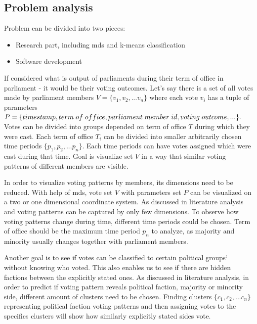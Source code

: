 \documentclass[a4paper,12pt]{article}
\begin{document}
	\clearpage
	 
 	 
 	\subsection{Problem analysis}
 	
 	Problem can be divided into two pieces:
 	\begin{itemize}
 		\item Research part, including \gls{mds} and \gls{k-means} classification
 		\item Software development
 	\end{itemize}
 	
 	If considered what is output of parliaments during their term of office in parliament - it would be their voting outcomes. Let's say there is a set of all votes made by parliament members $V = \{v_1, v_2, ... v_n\}$ where each vote $v_i$ has a tuple of parameters
	$	P = \{timestamp, term\; of\; office, \\ parliament\;member\;id, voting\;outcome,...\}.$	
 	 Votes can be divided into groups depended on term of office $T$ during which they were cast. Each term of office $T_i$ can be divided into smaller arbitrarily chosen time periods $\{p_1, p_2, ...p_n\}$. Each time periods can have votes assigned which were cast during that time. Goal is visualize set $V$ in a way that similar voting patterns of different members are visible. 
 	
 	In order to visualize voting patterns by members, its dimensions need to be reduced. With help of \acrfull{mds}, vote set $V$ with parameters set $P$ can be visualized on a two or one dimensional coordinate system. As discussed in literature analysis and \cite{poole_2005} voting patterns can be captured by only few dimensions. To observe how voting patterns change during time, different time periods could be chosen. Term of office should be the maximum time period $p_n$ to analyze, as majority and minority usually changes together with parliament members.
 	
 	Another goal is to see if votes can be classified to certain political groups` without knowing who voted. This also enables us to see if there are hidden factions between the explicitly stated ones. As discussed in literature analysis, in order to predict if voting pattern reveals political faction, majority or minority side, different amount of clusters need to be chosen. Finding clusters $\{c_1, c_2,...c_n\}$ representing political faction voting patterns and then assigning votes to the specifics clusters will show how similarly explicitly stated sides vote. 
 
\end{document}
